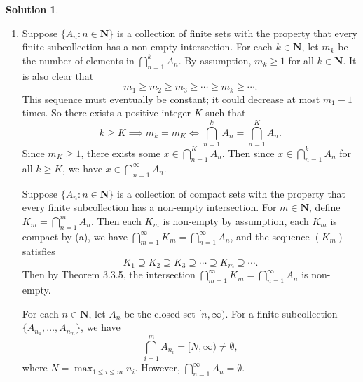\documentclass[12pt]{article}
\theoremstyle{definition}
\theoremstyle{exercise}
\theoremstyle{solution}
\newtheorem*{solution}{Solution}
\newcommand{\N}{\mathbf{N}}
\begin{document}
\begin{solution}
\begin{enumerate}
        \item Suppose \( \{ A_n : n \in \N \} \) is a collection of finite sets with the property that every finite subcollection has a non-empty intersection. For each \( k \in \N \), let \( m_k \) be the number of elements in \( \bigcap_{n=1}^k A_n \). By assumption, \( m_k \geq 1 \) for all \( k \in \N \). It is also clear that
        \[
            m_1 \geq m_2 \geq m_3 \geq \cdots \geq m_k \geq \cdots.
        \]
        This sequence must eventually be constant; it could decrease at most \( m_1 - 1 \) times. So there exists a positive integer \( K \) such that
        \[
            k \geq K \implies m_k = m_K \iff \bigcap_{n=1}^k A_n = \bigcap_{n=1}^K A_n.
        \]
        Since \( m_K \geq 1 \), there exists some \( x \in \bigcap_{n=1}^K A_n \). Then since \( x \in \bigcap_{n=1}^k A_n \) for all \( k \geq K \), we have \( x \in \bigcap_{n=1}^{\infty} A_n \).

        Suppose \( \{ A_n : n \in \N \} \) is a collection of compact sets with the property that every finite subcollection has a non-empty intersection. For \( m \in \N \), define \( K_m = \bigcap_{n=1}^m A_n \). Then each \( K_m \) is non-empty by assumption, each \( K_m \) is compact by  (a), we have \( \bigcap_{m=1}^{\infty} K_m = \bigcap_{n=1}^{\infty} A_n \), and the sequence \( (K_m) \) satisfies
        \[
            K_1 \supseteq K_2 \supseteq K_3 \supseteq \cdots \supseteq K_m \supseteq \cdots.
        \]
        Then by Theorem 3.3.5, the intersection \( \bigcap_{m=1}^{\infty} K_m = \bigcap_{n=1}^{\infty} A_n \) is non-empty.

        For each \( n \in \N \), let \( A_n \) be the closed set \( [n, \infty) \). For a finite subcollection \( \{ A_{n_1}, \ldots, A_{n_m} \} \), we have
        \[
            \bigcap_{i=1}^m A_{n_i} = [N, \infty) \neq \emptyset,
        \]
        where \( N = \max_{1 \leq i \leq m} n_i \). However, \( \bigcap_{n=1}^{\infty} A_n = \emptyset \).
    \end{enumerate}
\end{solution}
\end{document}
